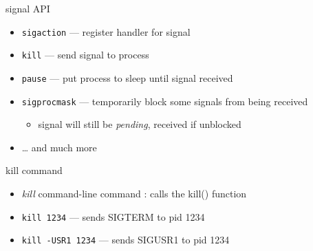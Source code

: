 
\begin{frame}{signal API}
\begin{itemize}
    \item {\tt sigaction} --- register handler for signal
    \item {\tt kill} --- send signal to process
    \item {\tt pause} --- put process to sleep until signal received
    \item {\tt sigprocmask} --- temporarily block some signals from being received
        \begin{itemize}
        \item signal will still be \textit{pending}, received if unblocked
        \end{itemize}
    \item \ldots{} and much more
\end{itemize}
\end{frame}

\begin{frame}{kill command}
    \begin{itemize}
    \item \textit{kill} command-line command : calls the kill() function
    \item \texttt{kill 1234} --- sends SIGTERM to pid 1234
    \item \texttt{kill -USR1 1234} --- sends SIGUSR1 to pid 1234
    \end{itemize}
\end{frame}
